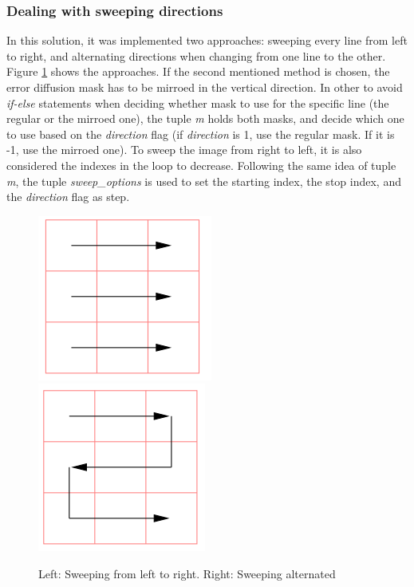 \documentclass[]{IEEEtran}
\begin{document}
\subsubsection{Dealing with sweeping directions}
In this solution, it was implemented two approaches: sweeping every line from left to right, and alternating directions when changing from one line to the other. Figure \ref{fig:sweepingmodes} shows the approaches. If the second mentioned method is chosen, the error diffusion mask has to be mirroed in the vertical direction. In other to avoid \textit{if-else} statements when deciding whether mask to use for the specific line (the regular or the mirroed one), the tuple \textit{m} holds both masks, and decide which one to use based on the \textit{direction} flag (if \textit{direction} is 1, use the regular mask. If it is -1, use the mirroed one). To sweep the image from right to left, it is also considered the indexes in the loop to decrease. Following the same idea of tuple \textit{m}, the tuple \textit{sweep\_options} is used to set the starting index, the stop index, and the \textit{direction} flag as step.

\begin{figure}[H]
  \centering
  \includegraphics[width=0.4\hsize]{images/sw-left-to-right.png}
  \includegraphics[width=0.4\hsize]{images/sw-alternate.png}
  \label{fig:sweepingmodes}
  \caption{Left: Sweeping from left to right. Right: Sweeping alternated}
\end{figure}
\end{document}
